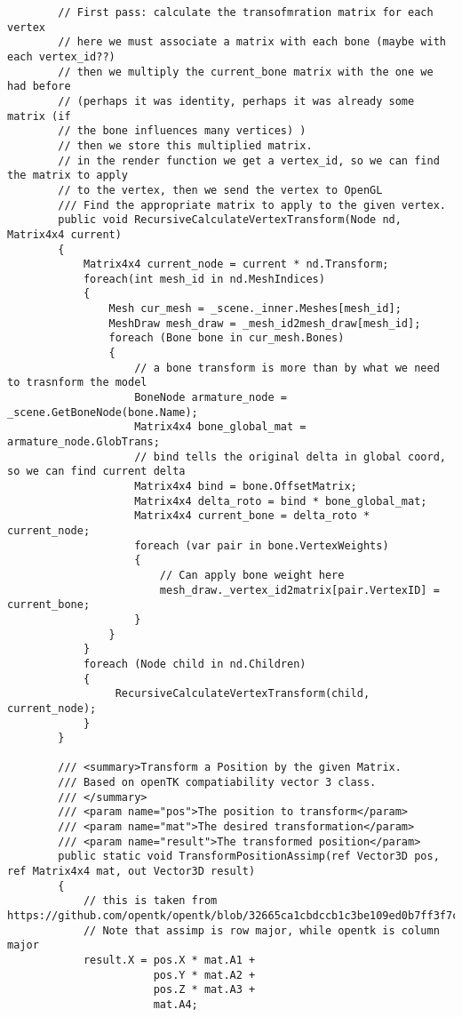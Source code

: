 \begin{scriptsize}
\begin{verbatim}
        // First pass: calculate the transofmration matrix for each vertex
        // here we must associate a matrix with each bone (maybe with each vertex_id??)
        // then we multiply the current_bone matrix with the one we had before 
        // (perhaps it was identity, perhaps it was already some matrix (if 
        // the bone influences many vertices) )
        // then we store this multiplied matrix.
        // in the render function we get a vertex_id, so we can find the matrix to apply 
        // to the vertex, then we send the vertex to OpenGL
        /// Find the appropriate matrix to apply to the given vertex.
        public void RecursiveCalculateVertexTransform(Node nd, Matrix4x4 current)
        {
            Matrix4x4 current_node = current * nd.Transform;
            foreach(int mesh_id in nd.MeshIndices)
            {
                Mesh cur_mesh = _scene._inner.Meshes[mesh_id];
                MeshDraw mesh_draw = _mesh_id2mesh_draw[mesh_id];
                foreach (Bone bone in cur_mesh.Bones)
                {
                    // a bone transform is more than by what we need to trasnform the model
                    BoneNode armature_node = _scene.GetBoneNode(bone.Name);
                    Matrix4x4 bone_global_mat = armature_node.GlobTrans;
                    // bind tells the original delta in global coord, so we can find current delta
                    Matrix4x4 bind = bone.OffsetMatrix;
                    Matrix4x4 delta_roto = bind * bone_global_mat;
                    Matrix4x4 current_bone = delta_roto * current_node;
                    foreach (var pair in bone.VertexWeights)
                    {
                        // Can apply bone weight here
                        mesh_draw._vertex_id2matrix[pair.VertexID] = current_bone;
                    }
                }
            }
            foreach (Node child in nd.Children)
            {
                 RecursiveCalculateVertexTransform(child, current_node);
            }
        }

        /// <summary>Transform a Position by the given Matrix.
        /// Based on openTK compatiability vector 3 class.
        /// </summary>
        /// <param name="pos">The position to transform</param>
        /// <param name="mat">The desired transformation</param>
        /// <param name="result">The transformed position</param>
        public static void TransformPositionAssimp(ref Vector3D pos, ref Matrix4x4 mat, out Vector3D result)
        {
            // this is taken from https://github.com/opentk/opentk/blob/32665ca1cbdccb1c3be109ed0b7ff3f7cb5cb5b7/Source/Compatibility/Math/Vector3.cs
            // Note that assimp is row major, while opentk is column major
            result.X = pos.X * mat.A1 +
                       pos.Y * mat.A2 +
                       pos.Z * mat.A3 +
                       mat.A4;


\end{verbatim}
\end{scriptsize}
